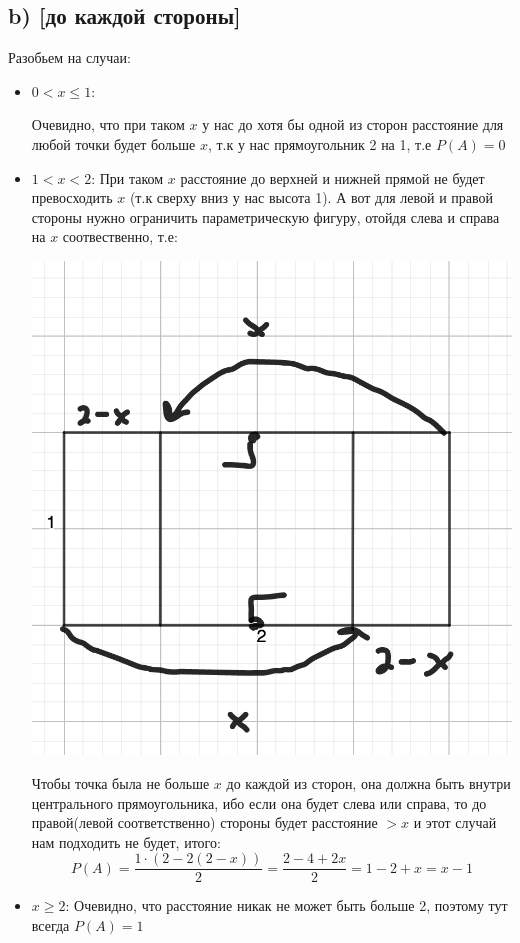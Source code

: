 \documentclass[a4paper,12pt]{article}
\begin{document}
\subsection*{b) [до каждой стороны]}
Разобьем на случаи:
\begin{itemize}
\item $0 < x \leq 1$:

Очевидно, что при таком $x$ у нас до хотя бы одной из сторон расстояние для любой точки будет больше $x$, т.к у нас прямоугольник 2 на 1, т.е $P(A) = 0$
\item $1 < x < 2$:
При таком $x$ расстояние до верхней и нижней прямой не будет превосходить $x$ (т.к сверху вниз у нас высота 1). А вот для левой и правой стороны нужно ограничить параметрическую фигуру, отойдя слева и справа на $x$ соотвественно, т.е:
\begin{center}
\includegraphics[scale=0.3]{4.png}
\end{center}
Чтобы точка была не больше $x$ до каждой из сторон, она должна быть внутри центрального прямоугольника, ибо если она будет слева или справа, то до правой(левой соответственно) стороны будет расстояние $>x$ и этот случай нам подходить не будет, итого:
\[
P(A) = \frac{1 \cdot (2 - 2(2-x))}{2} = \frac{2 - 4 + 2x}{2} = 1 - 2 + x = x - 1
\]
\item $x \geq 2$:
Очевидно, что расстояние никак не может быть больше 2, поэтому тут всегда $P(A) = 1$
\end{itemize} 
\end{document}
